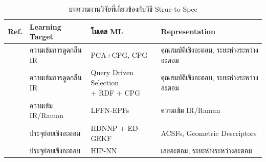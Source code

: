 \begin{table}[H]
    \centering
    \caption{บทความงานวิจัยที่เกี่ยวข้องกับวิธี Struc-to-Spec}
    \label{tab:struc2spec}
    \small
    \begin{tabular}{clll}
    \toprule
    \textbf{Ref.} &\textbf{Learning Target} &\textbf{โมเดล ML} &\textbf{Representation} \\
    \midrule
    \autocite{schuur1996,Schuur1997} & ความเข้มการดูดกลืน IR & PCA+CPG\autocite{hecht-nielsen1987}, 
    CPG\autocite{hecht-nielsen1987} & คุณสมบัติเชิงอะตอม, ระยะห่างระหว่างอะตอม \\
    
    \autocite{selzer2000,kostka2001} & ความเข้มการดูดกลืน IR & \makecell[tl]{Query Driven Selection \\ + RDF + 
    CPG\autocite{hecht-nielsen1987}} & คุณสมบัติเชิงอะตอม, ระยะห่างระหว่างอะตอม \\
    
    \autocite{yildiz2011,yildiz2012} & ความเข้ม IR/Raman & LFFN-EPFs\autocite{yildiz2011} & ความเข้ม IR/Raman \\
    
    \autocite{gastegger2017} & ประจุย่อยเชิงอะตอม & HDNNP\autocite{behler2007} + ED-GEKF\autocite{gastegger2015} 
    & ACSFs\autocite{behler2011a}, Geometric Descriptors \\
    
    \autocite{sifain2018,nebgen2018} & ประจุย่อยเชิงอะตอม & HIP-NN\autocite{lubbers2018} & เลขอะตอม, 
    ระยะห่างระหว่างอะตอม \\
   \bottomrule
\end{tabular}
\end{table}

